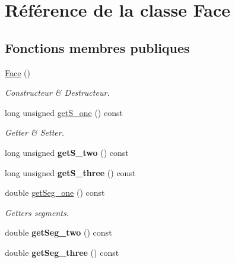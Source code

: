 \hypertarget{class_face}{\section{Référence de la classe Face}
\label{class_face}
}
\subsection*{Fonctions membres publiques}
\begin{DoxyCompactItemize}
\item 
\hyperlink{class_face_afdb634bc2d5287ba0d62e46b57e9dc2e}{Face} ()
\begin{DoxyCompactList}\small\item\em Constructeur \& Destructeur. \end{DoxyCompactList}\item 
long unsigned \hyperlink{class_face_a6a71144fe15d6edfab4cec3560bdb2aa}{get\-S\-\_\-one} () const 
\begin{DoxyCompactList}\small\item\em Getter \& Setter. \end{DoxyCompactList}\item 
\hypertarget{class_face_a5b35ec67e75df789092301fab06a951b}{long unsigned {\bfseries get\-S\-\_\-two} () const }\label{class_face_a5b35ec67e75df789092301fab06a951b}

\item 
\hypertarget{class_face_adddc2b56135f76b623a4ffa9b7c0953f}{long unsigned {\bfseries get\-S\-\_\-three} () const }\label{class_face_adddc2b56135f76b623a4ffa9b7c0953f}

\item 
\hypertarget{class_face_a906d16f2f1c9adbe881ae46ee7f3e3e9}{double \hyperlink{class_face_a906d16f2f1c9adbe881ae46ee7f3e3e9}{get\-Seg\-\_\-one} () const }\label{class_face_a906d16f2f1c9adbe881ae46ee7f3e3e9}

\begin{DoxyCompactList}\small\item\em Getters segments. \end{DoxyCompactList}\item 
\hypertarget{class_face_a50a58b3b43a78239defee57e7202968e}{double {\bfseries get\-Seg\-\_\-two} () const }\label{class_face_a50a58b3b43a78239defee57e7202968e}

\item 
\hypertarget{class_face_a19bb64415987240d90a1ec86d2432f05}{double {\bfseries get\-Seg\-\_\-three} () const }\label{class_face_a19bb64415987240d90a1ec86d2432f05}


\end{DoxyCompactItemize}
